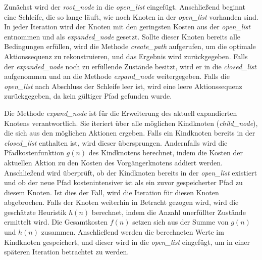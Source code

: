 Zunächst wird der \textit{root\_node} in die \textit{open\_list} eingefügt. Anschließend beginnt eine Schleife, die so lange läuft, wie noch Knoten in der \textit{open\_list} vorhanden sind. In jeder Iteration wird der Knoten mit den geringsten Kosten aus der \textit{open\_list} entnommen und als \textit{expanded\_node} gesetzt. Sollte dieser Knoten bereits alle Bedingungen erfüllen, wird die Methode \textit{create\_path} aufgerufen, um die optimale Aktionssequenz zu rekonstruieren, und das Ergebnis wird zurückgegeben. Falls der \textit{expanded\_node} noch zu erfüllende Zustände besitzt, wird er in die \textit{closed\_list} aufgenommen und an die Methode \textit{expand\_node} weitergegeben. Falls die \textit{open\_list} nach Abschluss der Schleife leer ist, wird eine leere Aktionssequenz zurückgegeben, da kein gültiger Pfad gefunden wurde.

Die Methode \textit{expand\_node} ist für die Erweiterung des aktuell expandierten Knotens verantwortlich. Sie iteriert über alle möglichen Kindknoten (\textit{child\_node}), die sich aus den möglichen Aktionen ergeben. Falls ein Kindknoten bereits in der \textit{closed\_list} enthalten ist, wird dieser übersprungen. Andernfalls wird die Pfadkostenfunktion $g(n)$ des Kindknotens berechnet, indem die Kosten der aktuellen Aktion zu den Kosten des Vorgängerknotens addiert werden. Anschließend wird überprüft, ob der Kindknoten bereits in der \textit{open\_list} existiert und ob der neue Pfad kostenintensiver ist als ein zuvor gespeicherter Pfad zu diesem Knoten. Ist dies der Fall, wird die Iteration für diesen Knoten abgebrochen. Falls der Knoten weiterhin in Betracht gezogen wird, wird die geschätzte Heuristik $h(n)$ berechnet, indem die Anzahl unerfüllter Zustände ermittelt wird. Die Gesamtkosten $f(n)$ setzen sich aus der Summe von $g(n)$ und $h(n)$ zusammen. Anschließend werden die berechneten Werte im Kindknoten gespeichert, und dieser wird in die \textit{open\_list} eingefügt, um in einer späteren Iteration betrachtet zu werden.


